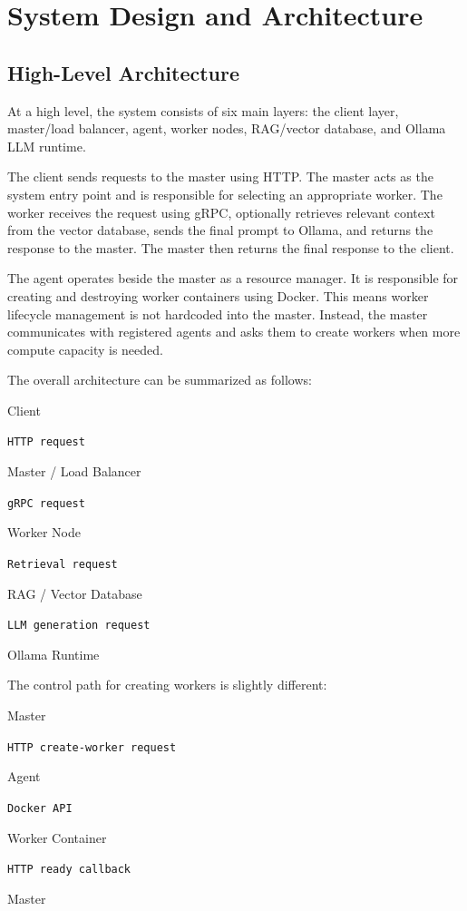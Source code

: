 \section{System Design and Architecture}

\subsection{High-Level Architecture}
At a high level, the system consists of six main layers: the client layer, master/load balancer, agent, worker nodes, RAG/vector database, and Ollama LLM runtime.

The client sends requests to the master using HTTP. The master acts as the system entry point and is responsible for selecting an appropriate worker. The worker receives the request using gRPC, optionally retrieves relevant context from the vector database, sends the final prompt to Ollama, and returns the response to the master. The master then returns the final response to the client.

The agent operates beside the master as a resource manager. It is responsible for creating and destroying worker containers using Docker. This means worker lifecycle management is not hardcoded into the master. Instead, the master communicates with registered agents and asks them to create workers when more compute capacity is needed.

The overall architecture can be summarized as follows:

\begin{center}
Client

\texttt{HTTP request}

Master / Load Balancer

\texttt{gRPC request}

Worker Node

\texttt{Retrieval request}

RAG / Vector Database

\texttt{LLM generation request}

Ollama Runtime
\end{center}

The control path for creating workers is slightly different:

\begin{center}
Master

\texttt{HTTP create-worker request}

Agent

\texttt{Docker API}

Worker Container

\texttt{HTTP ready callback}

Master
\end{center}

